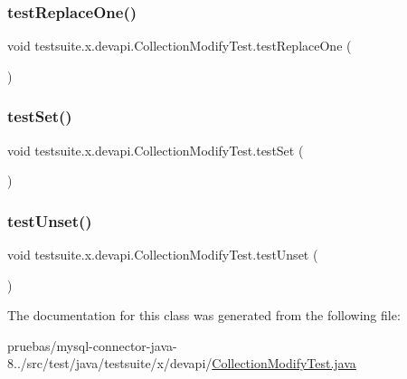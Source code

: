 \subsubsection{\texorpdfstring{test\+Replace\+One()}{testReplaceOne()}}
{\footnotesize\ttfamily void testsuite.\+x.\+devapi.\+Collection\+Modify\+Test.\+test\+Replace\+One (\begin{DoxyParamCaption}{ }\end{DoxyParamCaption})}

\mbox{\label{classtestsuite_1_1x_1_1devapi_1_1_collection_modify_test_a0a3cbc1056f520b18f4bf654516d1360}} 
\subsubsection{\texorpdfstring{test\+Set()}{testSet()}}
{\footnotesize\ttfamily void testsuite.\+x.\+devapi.\+Collection\+Modify\+Test.\+test\+Set (\begin{DoxyParamCaption}{ }\end{DoxyParamCaption})}

\mbox{\label{classtestsuite_1_1x_1_1devapi_1_1_collection_modify_test_ac3f16afaae76fea54241dcceb95866ad}} 
\subsubsection{\texorpdfstring{test\+Unset()}{testUnset()}}
{\footnotesize\ttfamily void testsuite.\+x.\+devapi.\+Collection\+Modify\+Test.\+test\+Unset (\begin{DoxyParamCaption}{ }\end{DoxyParamCaption})}



The documentation for this class was generated from the following file\+:\begin{DoxyCompactItemize}
\item 
pruebas/mysql-\/connector-\/java-\/8../src/test/java/testsuite/x/devapi/\mbox{\hyperlink{_collection_modify_test_8java}{Collection\+Modify\+Test.\+java}}\end{DoxyCompactItemize}
